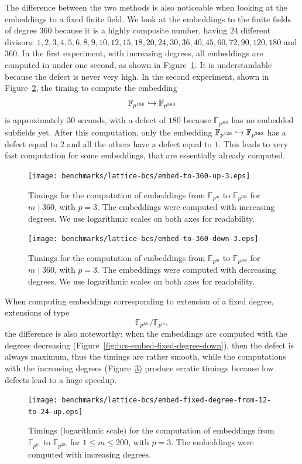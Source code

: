 The difference between the two methods is also noticeable when looking at the
embeddings to a fixed finite field. We look at the embeddings to the finite
fields of degree $360$ because it is a highly composite number, having $24$
different divisors: $1, 2, 3, 4, 5, 6, 8, 9, 10, 12, 15, 18, 20, 24, 30, 36, 40,
45, 60, 72, 90, 120, 180$ and $360$. In the first experiment, with increasing
degrees, all embeddings are computed in under one second, as shown in
Figure~\ref{fig:bcs-embed-to-360-up}. It is understandable because the defect is
never very high. In the second experiment, shown in
Figure~\ref{fig:bcs-embed-to-360-down}, the timing to compute the embedding 
\[
  \mathbb{F}_{p^{180}}\hookrightarrow\mathbb{F}_{p^{360}}
\]
is approximately $30$ seconds, with a defect of $180$ because
$\mathbb{F}_{p^{360}}$ has no embedded subfields yet. After this computation,
only the embedding $\mathbb{F}_{p^{120}}\hookrightarrow\mathbb{F}_{p^{360}}$ has a defect
equal to $2$ and all the others have a defect equal to $1$. This leads to very
fast computation for some embeddings, that are essentially already computed.
\begin{figure}
  \centering
  \texttt{[image: benchmarks/lattice-bcs/embed-to-360-up-3.eps]}
  \caption{Timings for the computation of embeddings from $\mathbb{F}_{p^{m}}$
  to $\mathbb{F}_{p^{360}}$ for $m\mid 360$, with $p=3$. The
  embeddings were computed with increasing degrees. We use logarithmic scales on
  both axes for readability.}
  \label{fig:bcs-embed-to-360-up}
\end{figure}
\begin{figure}
  \centering
  \texttt{[image: benchmarks/lattice-bcs/embed-to-360-down-3.eps]}
  \caption{Timings for the computation of embeddings from $\mathbb{F}_{p^{m}}$
  to $\mathbb{F}_{p^{360}}$ for $m\mid 360$, with $p=3$. The
  embeddings were computed with decreasing degrees. We use logarithmic scales on
  both axes for readability.}
  \label{fig:bcs-embed-to-360-down}
\end{figure}
When computing embeddings corresponding to extension of a fixed degree, \eg
extensions of type
\[
  \mathbb{F}_{p^{2m}}/\mathbb{F}_{p^{m}},
\]
the difference is also noteworthy: when the embeddings are computed with the
degrees decreasing (Figure~\ref{fig:bcs-embed-fixed-degree-down}), then the defect is
always maximum, thus the timings are rather smooth, while the computations with
the increasing degrees (Figure~\ref{fig:bcs-embed-fixed-degree-up}) produce
erratic timings because low defects lead to a huge speedup.
\begin{figure}
  \centering
  \texttt{[image: benchmarks/lattice-bcs/embed-fixed-degree-from-12-to-24-up.eps]}
  \caption{Timings (logarithmic scale) for the computation of embeddings from $\mathbb{F}_{p^{m}}$
  to $\mathbb{F}_{p^{2m}}$ for $1\leq m\leq 200$, with $p=3$. The
  embeddings were computed with increasing degrees.}
  \label{fig:bcs-embed-fixed-degree-up}
\end{figure}
